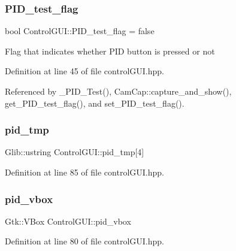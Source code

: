 \subsubsection{\texorpdfstring{P\+I\+D\+\_\+test\+\_\+flag}{PID\_test\_flag}}
{\footnotesize\ttfamily bool Control\+G\+U\+I\+::\+P\+I\+D\+\_\+test\+\_\+flag = false}

Flag that indicates whether P\+ID button is pressed or not 

Definition at line 45 of file control\+G\+U\+I.\+hpp.



Referenced by \+\_\+\+P\+I\+D\+\_\+\+Test(), Cam\+Cap\+::capture\+\_\+and\+\_\+show(), get\+\_\+\+P\+I\+D\+\_\+test\+\_\+flag(), and set\+\_\+\+P\+I\+D\+\_\+test\+\_\+flag().

\mbox{\label{class_control_g_u_i_aba421fd043ebac1c17826b47e5ac2bda}} 
\subsubsection{\texorpdfstring{pid\+\_\+tmp}{pid\_tmp}}
{\footnotesize\ttfamily Glib\+::ustring Control\+G\+U\+I\+::pid\+\_\+tmp\mbox{[}4\mbox{]}}



Definition at line 85 of file control\+G\+U\+I.\+hpp.

\mbox{\label{class_control_g_u_i_ac99f046edb79dff4637bbcf0338fbd1a}} 
\subsubsection{\texorpdfstring{pid\+\_\+vbox}{pid\_vbox}}
{\footnotesize\ttfamily Gtk\+::\+V\+Box Control\+G\+U\+I\+::pid\+\_\+vbox}



Definition at line 80 of file control\+G\+U\+I.\+hpp.

\mbox{\label{class_control_g_u_i_afc2b8ff626fa4298d6901807a7dfccf9}} 
